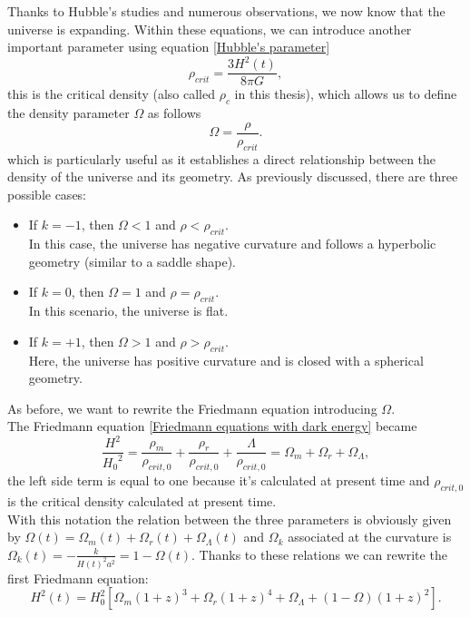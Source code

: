 Thanks to Hubble's studies and numerous observations, we now know that the universe is expanding.
Within these equations, we can introduce another important parameter using equation \eqref{Hubble's parameter}
\begin{equation} \label{critical density}
    \rho_{crit} = \frac{3H^2(t)}{8 \pi G},
\end{equation}
this is the critical density (also called $\rho_c$ in this thesis), which allows us to define the density parameter $\Omega$ as follows
\begin{equation}
    \label{Omega definition}
    \Omega = \frac{\rho}{\rho_{crit}}.
\end{equation}
which is particularly useful as it establishes a direct relationship between the density of the universe and its geometry. As previously discussed, there are three possible cases:
\begin{itemize}
    \item If $k = -1$, then $\Omega < 1$ and $\rho < \rho_{crit}$.\\
    In this case, the universe has negative curvature and follows a hyperbolic geometry (similar to a saddle shape).
    \item If $k = 0$, then $\Omega = 1$ and $\rho = \rho_{crit}$.\\
    In this scenario, the universe is flat.
    \item If $k = +1$, then $\Omega > 1$ and $\rho > \rho_{crit}$.\\
    Here, the universe has positive curvature and is closed with a spherical geometry.
\end{itemize}
As before, we want to rewrite the Friedmann equation introducing $\Omega$.\\ The Friedmann equation \eqref{Friedmann equations with dark energy} became 
\begin{equation}
    \frac{H^2}{{H_0}^2} = \frac{\rho_m}{\rho_{crit, 0}} + \frac{\rho_r}{\rho_{crit, 0}} + \frac{\Lambda}{\rho_{crit,0}} = \Omega_m + \Omega_r + \Omega_\Lambda,
\end{equation}
the left side term is equal to one because it's calculated at present time and $\rho_{crit, 0}$ is the critical density calculated at present time.\\
With this notation the relation between the three parameters is obviously given by $\Omega(t) = \Omega_m (t) + \Omega_r (t) + \Omega_\Lambda (t)$ and $\Omega_k$ associated at the curvature is $\Omega_k (t) = - \frac{k}{H(t)^2 a^2} = 1 - \Omega (t)$. Thanks to these relations we can rewrite the first Friedmann equation:
\begin{equation}
    H^2 (t) = H_0^2 [\Omega_m (1+z)^3 + \Omega_r (1+z)^4 + \Omega_\Lambda +(1-\Omega)(1+z)^2].
\end{equation}

